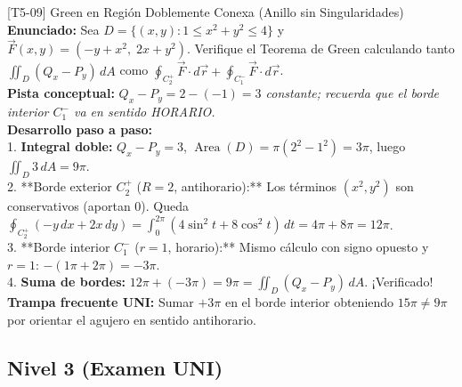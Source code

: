 \documentclass[11pt,a4paper]{article}
\begin{document}
\begin{ejerciciobox}{[T5-09] Green en Región Doblemente Conexa (Anillo sin Singularidades)}
\textbf{Enunciado:} Sea $D = \{(x,y) : 1 \le x^2 + y^2 \le 4\}$ y $\vec{F}(x,y) = (-y + x^2,\; 2x + y^2)$. Verifique el Teorema de Green calculando tanto $\iint_D (Q_x-P_y)\,dA$ como $\oint_{C_2^+} \vec{F}\cdot d\vec{r} + \oint_{C_1^-} \vec{F}\cdot d\vec{r}$.\\[0.2cm]
\textbf{Pista conceptual:} \emph{$Q_x - P_y = 2 - (-1) = 3$ constante; recuerda que el borde interior $C_1^-$ va en sentido HORARIO.}\\[0.2cm]
\textbf{Desarrollo paso a paso:}\\
1. \textbf{Integral doble:} $Q_x - P_y = 3$, $\operatorname{Area}(D) = \pi(2^2 - 1^2) = 3\pi$, luego $\iint_D 3\,dA = 9\pi$.\\
2. **Borde exterior $C_2^+$ ($R=2$, antihorario):** Los términos $(x^2, y^2)$ son conservativos (aportan $0$). Queda $\oint_{C_2^+} (-y\,dx + 2x\,dy) = \int_0^{2\pi} (4\sin^2 t + 8\cos^2 t)\,dt = 4\pi + 8\pi = 12\pi$.\\
3. **Borde interior $C_1^-$ ($r=1$, horario):** Mismo cálculo con signo opuesto y $r=1$: $-(1\pi + 2\pi) = -3\pi$.\\
4. \textbf{Suma de bordes:} $12\pi + (-3\pi) = 9\pi = \iint_D (Q_x - P_y)\,dA$. ¡Verificado!\\[0.2cm]
\textbf{Trampa frecuente UNI:} Sumar $+3\pi$ en el borde interior obteniendo $15\pi \neq 9\pi$ por orientar el agujero en sentido antihorario.
\end{ejerciciobox}

\subsection{Nivel 3 (Examen UNI)}
\end{document}
